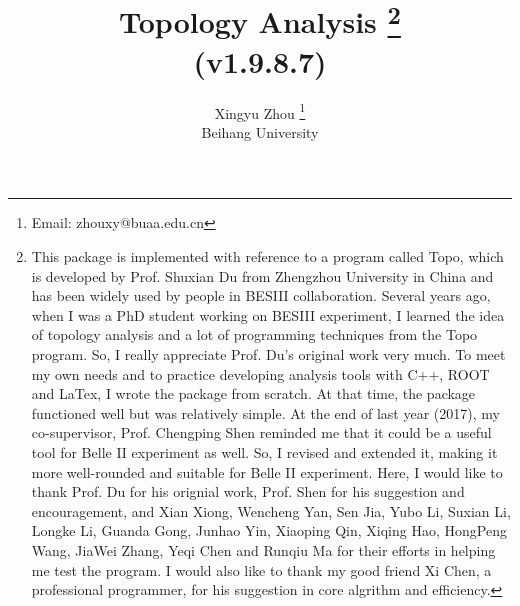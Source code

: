 \documentclass[landscape]{article}
\begin{document}
\title{Topology Analysis \footnote{\normalsize{This package is implemented with reference to a program called {\sc Topo}, which is developed by Prof. Shuxian Du from Zhengzhou University in China and has been widely used by people in BESIII collaboration. Several years ago, when I was a PhD student working on BESIII experiment, I learned the idea of topology analysis and a lot of programming techniques from the {\sc Topo} program. So, I really appreciate Prof. Du's original work very much. To meet my own needs and to practice developing analysis tools with C++, ROOT and LaTex, I wrote the package from scratch. At that time, the package functioned well but was relatively simple. At the end of last year (2017), my co-supervisor, Prof. Chengping Shen reminded me that it could be a useful tool for Belle II experiment as well. So, I revised and extended it, making it more well-rounded and suitable for Belle II experiment. Here, I would like to thank Prof. Du for his orignial work, Prof. Shen for his suggestion and encouragement, and Xian Xiong, Wencheng Yan, Sen Jia, Yubo Li, Suxian Li, Longke Li, Guanda Gong, Junhao Yin, Xiaoping Qin, Xiqing Hao, HongPeng Wang, JiaWei Zhang, Yeqi Chen and Runqiu Ma for their efforts in helping me test the program. I would also like to thank my good friend Xi Chen, a professional programmer, for his suggestion in core algrithm and efficiency.}} \\ \vspace{0.1cm} \Large{(v1.9.8.7)}}
\author{Xingyu Zhou \footnote{\normalsize{Email: zhouxy@buaa.edu.cn}} \\ \vspace{0.1cm} Beihang University}
\maketitle

\clearpage


\listoftables


\clearpage
\end{document}
